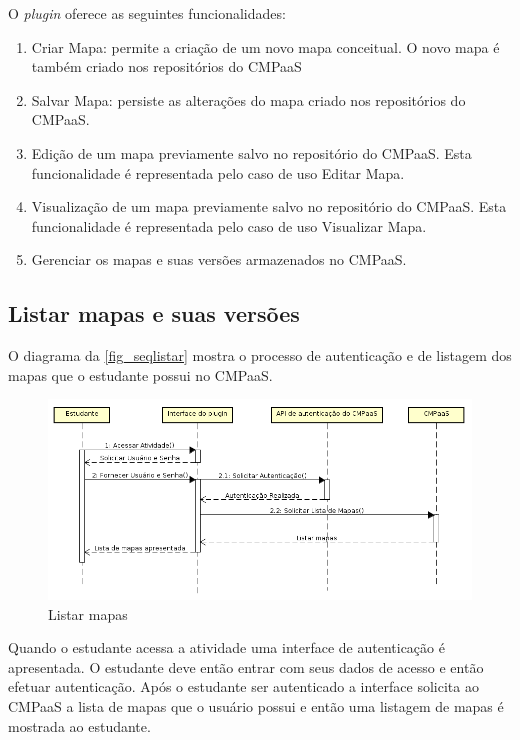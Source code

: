 \documentclass[
	12pt,				%
	openright,			%
	oneside,			%
	a4paper,			%
	english,			%
	french,				%
	spanish,			%
	brazil				%
	]{abntex2}
\begin{document}
O \textit{plugin} oferece as seguintes funcionalidades:

\begin{enumerate}
	\item Criar Mapa: permite a criação de um novo mapa conceitual. O novo mapa é também criado nos repositórios do CMPaaS
	\item Salvar Mapa: persiste as alterações do  mapa  criado  nos  repositórios  do  CMPaaS.
	\item  Edição de um mapa previamente salvo no repositório do CMPaaS. Esta funcionalidade é representada pelo caso de uso Editar Mapa.
	\item Visualização de um mapa previamente salvo no repositório do CMPaaS. Esta funcionalidade é representada pelo caso de uso Visualizar Mapa.
	\item Gerenciar os mapas e suas versões armazenados no CMPaaS.
\end{enumerate}  

\subsection{Listar mapas e suas versões}

O diagrama da \autoref{fig_seqlistar} mostra o processo de autenticação e de listagem dos mapas que o estudante possui no CMPaaS. 

\begin{figure}[htb]
	\caption{\label{fig_seqlistar} Listar mapas}
	\begin{center}
		\includegraphics[scale=0.4]{seqlistar.png}
	\end{center}
\end{figure}

Quando o estudante acessa a atividade uma interface de autenticação é apresentada. O estudante deve então entrar com seus dados de acesso e então efetuar autenticação. Após o estudante ser autenticado a interface solicita ao CMPaaS a lista de mapas que o usuário possui e então uma listagem de mapas é mostrada ao estudante.  
\end{document}
